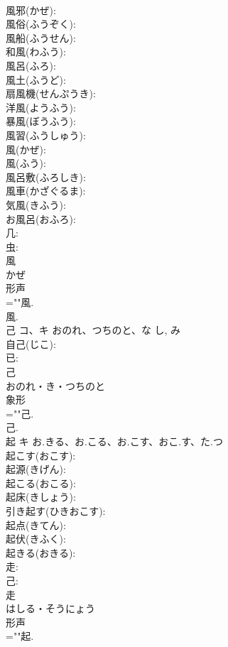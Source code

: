 \documentclass[8pt]{extreport}
\begin{document}
\begin{CJK}{UTF8}{min}
\\	風邪(かぜ): 
\\	風俗(ふうぞく): 
\\	風船(ふうせん): 
\\	和風(わふう): 
\\	風呂(ふろ): 
\\	風土(ふうど): 
\\	扇風機(せんぷうき): 
\\	洋風(ようふう): 
\\	暴風(ぼうふう): 
\\	風習(ふうしゅう): 
\\	風(かぜ): 
\\	風(ふう): 
\\	風呂敷(ふろしき): 
\\	風車(かざぐるま): 
\\	気風(きふう): 
\\	お風呂(おふろ): 
\\	几: 
\\	虫: 
\\	風	
\\	かぜ	
\\	形声 
\\	=""風.
\\	風.
\\	己	コ、キ	おのれ、つちのと、な	し, み	
\\	自己(じこ): 
\\	已: 
\\	己	
\\	おのれ・き・つちのと	
\\	象形 
\\	=""己.
\\	己.
\\	起	キ	お.きる、お.こる、お.こす、おこ.す、た.つ		
\\	起こす(おこす): 
\\	起源(きげん): 
\\	起こる(おこる): 
\\	起床(きしょう): 
\\	引き起す(ひきおこす): 
\\	起点(きてん): 
\\	起伏(きふく): 
\\	起きる(おきる): 
\\	走: 
\\	己: 
\\	走	
\\	はしる・そうにょう	
\\	形声 
\\	=""起.

\end{CJK}
\end{document}
